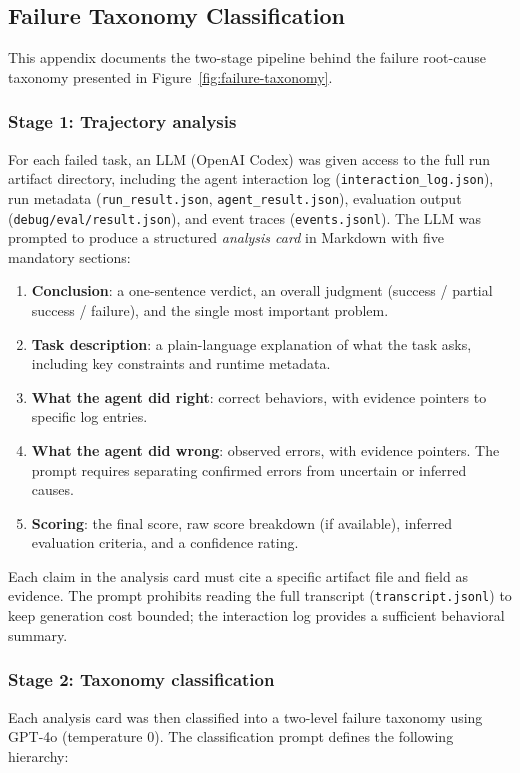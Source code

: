 \subsection{Failure Taxonomy Classification}
\label{app:failure-taxonomy}

This appendix documents the two-stage pipeline behind the failure root-cause taxonomy presented in Figure~\ref{fig:failure-taxonomy}.

\subsubsection{Stage 1: Trajectory analysis}
For each failed task, an LLM (OpenAI Codex) was given access to the full run artifact directory, including the agent interaction log (\texttt{interaction\_log.json}), run metadata (\texttt{run\_result.json}, \texttt{agent\_result.json}), evaluation output (\texttt{debug/eval/result.json}), and event traces (\texttt{events.jsonl}).
The LLM was prompted to produce a structured \emph{analysis card} in Markdown with five mandatory sections:

\begin{enumerate}[leftmargin=*,itemsep=2pt]
    \item \textbf{Conclusion}: a one-sentence verdict, an overall judgment (success / partial success / failure), and the single most important problem.
    \item \textbf{Task description}: a plain-language explanation of what the task asks, including key constraints and runtime metadata.
    \item \textbf{What the agent did right}: correct behaviors, with evidence pointers to specific log entries.
    \item \textbf{What the agent did wrong}: observed errors, with evidence pointers. The prompt requires separating confirmed errors from uncertain or inferred causes.
    \item \textbf{Scoring}: the final score, raw score breakdown (if available), inferred evaluation criteria, and a confidence rating.
\end{enumerate}

Each claim in the analysis card must cite a specific artifact file and field as evidence.
The prompt prohibits reading the full transcript (\texttt{transcript.jsonl}) to keep generation cost bounded; the interaction log provides a sufficient behavioral summary.

\subsubsection{Stage 2: Taxonomy classification}
Each analysis card was then classified into a two-level failure taxonomy using GPT-4o (temperature 0).
The classification prompt defines the following hierarchy:

